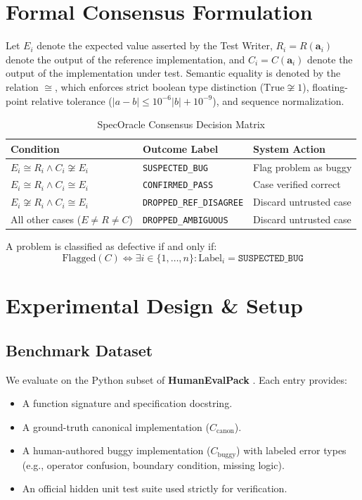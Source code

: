 \documentclass[conference]{IEEEtran}
\begin{document}
\section{Formal Consensus Formulation}
Let $E_i$ denote the expected value asserted by the Test Writer, $R_i = R(\mathbf{a}_i)$ denote the output of the reference implementation, and $C_i = C(\mathbf{a}_i)$ denote the output of the implementation under test.
Semantic equality is denoted by the relation $\cong$, which enforces strict boolean type distinction ($\text{True} \not\cong 1$), floating-point relative tolerance ($|a - b| \le 10^{-6}|b| + 10^{-9}$), and sequence normalization.

\begin{table}[h]
\centering
\caption{SpecOracle Consensus Decision Matrix}
\label{tab:matrix}
\begin{tabular}{lll}
\toprule
\textbf{Condition} & \textbf{Outcome Label} & \textbf{System Action} \\
\midrule
$E_i \cong R_i \land C_i \not\cong E_i$ & \texttt{SUSPECTED\_BUG} & Flag problem as buggy \\
$E_i \cong R_i \land C_i \cong E_i$ & \texttt{CONFIRMED\_PASS} & Case verified correct \\
$E_i \not\cong R_i \land C_i \cong E_i$ & \texttt{DROPPED\_REF\_DISAGREE} & Discard untrusted case \\
All other cases ($E \neq R \neq C$) & \texttt{DROPPED\_AMBIGUOUS} & Discard untrusted case \\
\bottomrule
\end{tabular}
\end{table}

A problem is classified as defective if and only if:
\begin{equation}
\text{Flagged}(C) \iff \exists i \in \{1, \dots, n\} : \text{Label}_i = \texttt{SUSPECTED\_BUG}
\end{equation}

\section{Experimental Design \& Setup}

\subsection{Benchmark Dataset}
We evaluate on the Python subset of \textbf{HumanEvalPack} \cite{muennighoff2023octopack}. Each entry provides:
\begin{itemize}
    \item A function signature and specification docstring.
    \item A ground-truth canonical implementation ($C_{\text{canon}}$).
    \item A human-authored buggy implementation ($C_{\text{buggy}}$) with labeled error types (e.g., operator confusion, boundary condition, missing logic).
    \item An official hidden unit test suite used strictly for verification.
\end{itemize}
\end{document}
